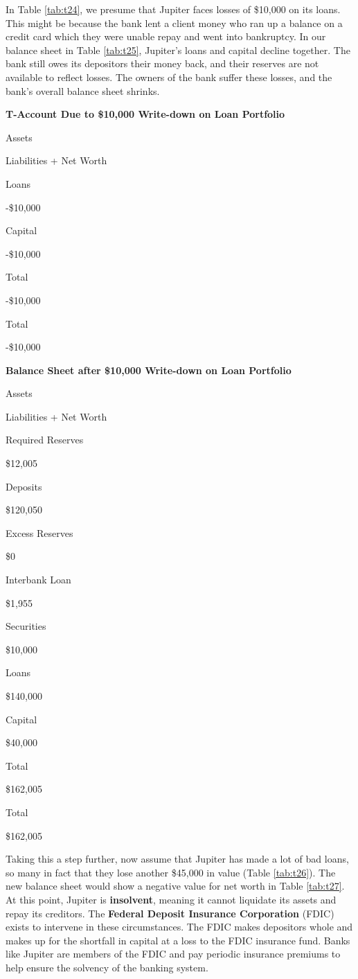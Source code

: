 \documentclass[
]{book}
\begin{document}
In Table \ref{tab:t24}, we presume that Jupiter faces losses of \$10,000 on its loans. This might be because the bank lent a client money who ran up a balance on a credit card which they were unable repay and went into bankruptcy. In our balance sheet in Table \ref{tab:t25}, Jupiter's loans and capital decline together. The bank still owes its depositors their money back, and their reserves are not available to reflect losses. The owners of the bank suffer these losses, and the bank's overall balance sheet shrinks.

\label{tab:t24}\textbf{T-Account Due to \$10,000 Write-down on Loan Portfolio}

Assets

Liabilities + Net Worth

Loans

-\$10,000

Capital

-\$10,000

Total

-\$10,000

Total

-\$10,000

\label{tab:t25}\textbf{Balance Sheet after \$10,000 Write-down on Loan Portfolio}

Assets

Liabilities + Net Worth

Required Reserves

\$12,005

Deposits

\$120,050

Excess Reserves

\$0

Interbank Loan

\$1,955

Securities

\$10,000

Loans

\$140,000

Capital

\$40,000

Total

\$162,005

Total

\$162,005

Taking this a step further, now assume that Jupiter has made a lot of bad loans, so many in fact that they lose another \$45,000 in value (Table \ref{tab:t26}). The new balance sheet would show a negative value for net worth in Table \ref{tab:t27}. At this point, Jupiter is \textbf{insolvent}, meaning it cannot liquidate its assets and repay its creditors. The \textbf{Federal Deposit Insurance Corporation} (FDIC) exists to intervene in these circumstances. The FDIC makes depositors whole and makes up for the shortfall in capital at a loss to the FDIC insurance fund. Banks like Jupiter are members of the FDIC and pay periodic insurance premiums to help ensure the solvency of the banking system.
\end{document}
